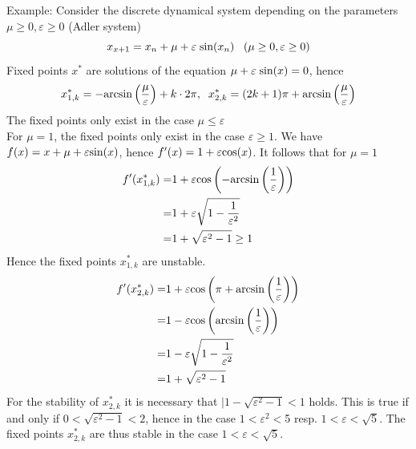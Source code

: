 Example: Consider the discrete dynamical system depending on the parameters $\mu \geq 0, \varepsilon \geq 0$ (Adler system)
\begin{equation}
  x_{x+1} = x_n + \mu + \varepsilon \; \textup{sin}(x_n) \;\;\; (\mu \geq 0, \varepsilon \geq 0)
\end{equation}
Fixed points $x^*$ are solutions of the equation $\mu + \varepsilon \; \textup{sin}(x) = 0$, hence
\begin{equation}
  x^*_{1, k} = -\textup{arcsin}\left(\frac{\mu}{\varepsilon}\right) + k \cdot 2\pi, \;\;
  x^*_{2, k} = (2k + 1)\pi + \textup{arcsin}\left(\frac{\mu}{\varepsilon}\right)
\end{equation}
The fixed points only exist in the case $\mu \leq \varepsilon$\\
For $\mu = 1$, the fixed points only exist in the case $\varepsilon \geq 1$. We have $f(x) = x + \mu + \varepsilon \textup{sin}(x)$, hence $f'(x) = 1 + \varepsilon \textup{cos}(x)$. It follows that for $\mu = 1$
\begin{equation}
  \begin{split}
    f'(x^*_{1, k}) =& 1 + \varepsilon \textup{cos}\left(-\textup{arcsin}\left(\frac{1}{\varepsilon}\right)\right)\\
    =& 1 + \varepsilon \sqrt{1 - \frac{1}{\varepsilon^2}}\\
    =& 1 + \sqrt{\varepsilon^2 - 1} \geq 1
  \end{split}
\end{equation}
Hence the fixed points $x^*_{1, k}$ are unstable.
\begin{equation}
  \begin{split}
    f'(x^*_{2, k}) =& 1 + \varepsilon \textup{cos}\left(\pi + \textup{arcsin}\left(\frac{1}{\varepsilon}\right)\right)\\
    =& 1 - \varepsilon \textup{cos}\left(\textup{arcsin}\left(\frac{1}{\varepsilon}\right)\right)\\
    =& 1 - \varepsilon \sqrt{1 - \frac{1}{\varepsilon^2}}\\
    =& 1 + \sqrt{\varepsilon^2 - 1}
  \end{split}
\end{equation}
For the stability of $x^*_{2, k}$ it is necessary that $|1 - \sqrt{\varepsilon^2-1} < 1$ holds. This is true if and only if $0 < \sqrt{\varepsilon^2 - 1} < 2$, hence in the case $1 < \varepsilon^2 < $5 resp. $1 < \varepsilon < \sqrt{5}$. The fixed points $x^*_{2, k}$ are thus stable in the case $1<\varepsilon<\sqrt{5}$.
